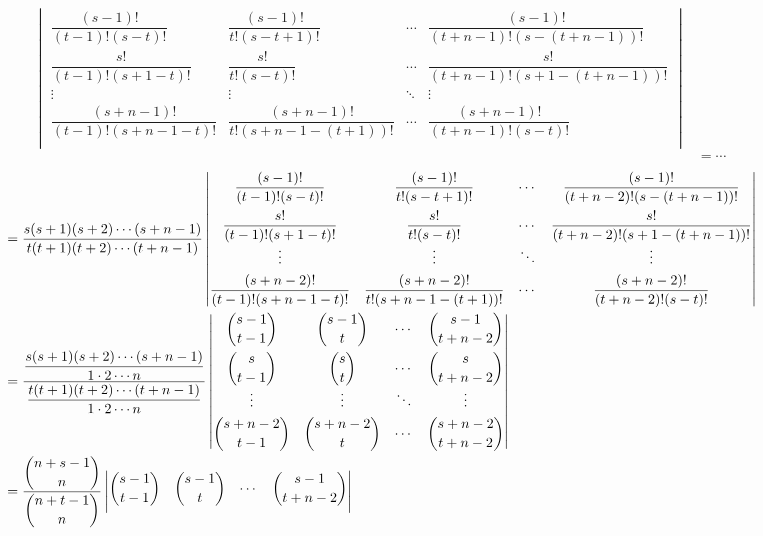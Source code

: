 \documentclass{ctexart}
\begin{document}
\begin{solution}
\begin{landscape}
\begin{align*}
\begin{vmatrix}
                \dfrac{(s-1)!}{(t-1)!(s-t)!} & \dfrac{(s-1)!}{t!(s-t+1)!} & \cdots & \dfrac{(s-1)!}{(t+n-1)!(s-(t+n-1))!} \\[10pt]
                \dfrac{s!}{(t-1)!(s+1-t)!} & \dfrac{s!}{t!(s-t)!} & \cdots & \dfrac{s!}{(t+n-1)!(s+1-(t+n-1))!} \\
                \vdots & \vdots & \ddots & \vdots \\[4pt]
                \dfrac{(s+n-1)!}{(t-1)!(s+n-1-t)!} & \dfrac{(s+n-1)!}{t!(s+n-1-(t+1))!} & \cdots & \dfrac{(s+n-1)!}{(t+n-1)!(s-t)!} \\
            \end{vmatrix} \\
            & =\cdots
        \end{align*}
        \begin{align*}
            & =\dfrac{s(s+1)(s+2)\cdots(s+n-1)}{t(t+1)(t+2)\cdots(t+n-1)}\begin{vmatrix}
                \dfrac{(s-1)!}{(t-1)!(s-t)!} & \dfrac{(s-1)!}{t!(s-t+1)!} & \cdots & \dfrac{(s-1)!}{(t+n-2)!(s-(t+n-1))!} \\[10pt]
                \dfrac{s!}{(t-1)!(s+1-t)!} & \dfrac{s!}{t!(s-t)!} & \cdots & \dfrac{s!}{(t+n-2)!(s+1-(t+n-1))!} \\
                \vdots & \vdots & \ddots & \vdots \\[4pt]
                \dfrac{(s+n-2)!}{(t-1)!(s+n-1-t)!} & \dfrac{(s+n-2)!}{t!(s+n-1-(t+1))!} & \cdots & \dfrac{(s+n-2)!}{(t+n-2)!(s-t)!} \\
            \end{vmatrix} \\
            & =\dfrac{\dfrac{s(s+1)(s+2)\cdots(s+n-1)}{1\cdot2\cdots n}}{\dfrac{t(t+1)(t+2)\cdots(t+n-1)}{1\cdot2\cdots n}}\begin{vmatrix}
                \dbinom{s-1}{t-1} & \dbinom{s-1}{t} & \cdots & \dbinom{s-1}{t+n-2} \\[10pt]
                \dbinom{s}{t-1} & \dbinom{s}{t} & \cdots & \dbinom{s}{t+n-2} \\
                \vdots & \vdots & \ddots & \vdots \\[4pt]
                \dbinom{s+n-2}{t-1} & \dbinom{s+n-2}{t} & \cdots & \dbinom{s+n-2}{t+n-2} \\
            \end{vmatrix} \\
            & =\dfrac{\dbinom{n+s-1}{n}}{\dbinom{n+t-1}{n}}\begin{vmatrix}
                \dbinom{s-1}{t-1} & \dbinom{s-1}{t} & \cdots & \dbinom{s-1}{t+n-2} \\[10pt]

\end{vmatrix}
\end{align*}
\end{landscape}
\end{solution}
\end{document}
